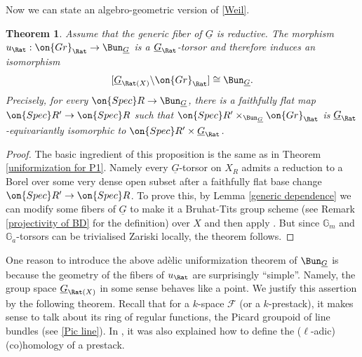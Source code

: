 \documentclass[]{pcmi}
\theoremstyle{plain}
\newtheorem{thm}[equation]{Theorem}
\theoremstyle{remark}
\theoremstyle{definition}
\newcommand{\bG}{{\mathbb G}}
\newcommand{\mF}{{\mathcal F}}
\newcommand{\Gr}{{\on{Gr}}}
\newcommand{\Spec}{\on{Spec}}
\begin{document}
Now we can state an algebro-geometric version of \eqref{Weil}.
\begin{thm}\label{ran uniformization of BunG}
Assume that the generic fiber of $\underline G$ is reductive.
The morphism $u_{\Rat}:\Gr_{\Rat}\to\Bun_{\underline G}$ is a ${\underline G}_{\Rat}$-torsor and therefore induces an isomorphism 
$$[{\underline G}_{\Rat(X)}\backslash \Gr_{\Rat}]\cong \Bun_{\underline G}.$$ Precisely, for every $\Spec R\to \Bun_{\underline G}$, there is a faithfully flat map $\Spec R'\to \Spec R$ such that $\Spec R'\times_{\Bun_{\underline G}}\Gr_{\Rat}$ is ${\underline G}_{\Rat}$-equivariantly isomorphic to $\Spec R'\times {\underline G}_{\Rat}$. 
\end{thm}
\begin{proof}
The basic ingredient of this proposition is the same as in Theorem \ref{uniformization for P1}. Namely every $\underline G$-torsor on $X_R$ admits a reduction to a Borel over some very dense open subset after a faithfully flat base change $\Spec R'\to\Spec R$. To prove this, by Lemma \ref{generic dependence} we can modify some fibers of $\underline G$ to make it a Bruhat-Tits group scheme (see Remark \ref{projectivity of BD} for the definition) over $X$ and then apply \cite[Corollary 26]{He}. But since $\bG_m$ and $\bG_a$-torsors can be trivialised Zariski locally, the theorem follows.
\end{proof}



One reason to introduce the above ad\`elic uniformization theorem of $\Bun_{\underline G}$ is because the geometry of the fibers of $u_{\Rat}$ are surprisingly ``simple''. Namely,
the group space ${\underline G}_{\Rat(X)}$ in some sense behaves like a point. We justify this assertion by the following theorem. 
Recall that for a $k$-space $\mF$ (or a $k$-prestack), it makes sense to talk about its ring of regular functions, the Picard groupoid of line bundles (see \eqref{Pic line}). In \cite[\S~2]{GL}, it was also explained how to define the ($\ell$-adic) (co)homology of a prestack.
\end{document}
